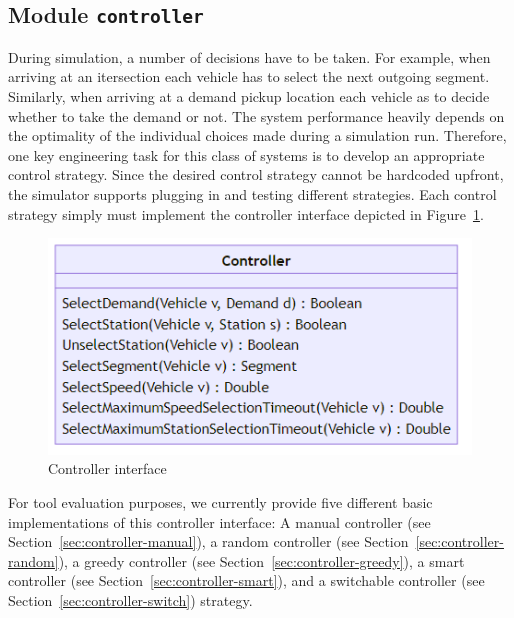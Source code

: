 \documentclass[10pt,twocolumn]{article}
\begin{document}
\subsection{Module \texttt{controller}}
\label{sec:controller-interface}


During simulation, a number of decisions have to be taken.
For example, when arriving at an itersection each vehicle has to select the next outgoing segment.
Similarly, when arriving at a demand pickup location each vehicle as to decide whether to take the demand or not.
The system performance heavily depends on the optimality of the individual choices made during a simulation run.
Therefore, one key engineering task for this class of systems is to develop an appropriate control strategy.
Since the desired control strategy cannot be hardcoded upfront, the simulator supports plugging in and testing different strategies.
Each control strategy simply must implement the controller interface depicted in Figure~\ref{fig:controller-interface}.

\begin{figure}[h!]
    \centering
    \includegraphics[scale=0.4]{../../diagrams/controller/classes-minimal.png}
    \caption{Controller interface}
    \label{fig:controller-interface}
\end{figure}

For tool evaluation purposes, we currently provide five different basic implementations of this controller interface:
A manual controller (see Section~\ref{sec:controller-manual}), a random controller (see Section~\ref{sec:controller-random}), a greedy controller (see Section~\ref{sec:controller-greedy}), a smart controller (see Section~\ref{sec:controller-smart}), and a switchable controller (see Section~\ref{sec:controller-switch}) strategy.
\end{document}
